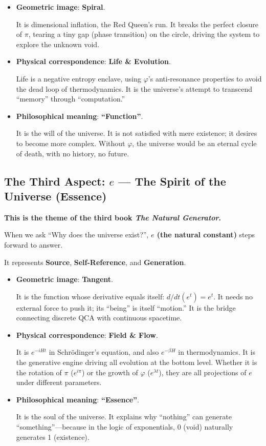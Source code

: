 \documentclass[11pt,a4paper,twoside]{book}
\begin{document}
\begin{itemize}
\item \textbf{Geometric image}: \textbf{Spiral}.

    It is dimensional inflation, the Red Queen's run. It breaks the perfect closure of $\pi$, tearing a tiny gap (phase transition) on the circle, driving the system to explore the unknown void.

\item \textbf{Physical correspondence}: \textbf{Life \& Evolution}.

    Life is a negative entropy enclave, using $\varphi$'s anti-resonance properties to avoid the dead loop of thermodynamics. It is the universe's attempt to transcend ``memory'' through ``computation.''

\item \textbf{Philosophical meaning}: \textbf{``Function''}.

    It is the will of the universe. It is not satisfied with mere existence; it desires to become more complex. Without $\varphi$, the universe would be an eternal cycle of death, with no history, no future.
\end{itemize}

\subsection{The Third Aspect: $e$ --- The Spirit of the Universe (Essence)}

\textbf{This is the theme of the third book \textit{The Natural Generator}.}

When we ask ``Why does the universe exist?'', \textbf{$e$ (the natural constant)} steps forward to answer.

It represents \textbf{Source}, \textbf{Self-Reference}, and \textbf{Generation}.

\begin{itemize}
\item \textbf{Geometric image}: \textbf{Tangent}.

    It is the function whose derivative equals itself: $d/dt(e^t) = e^t$. It needs no external force to push it; its ``being'' is itself ``motion.'' It is the bridge connecting discrete QCA with continuous spacetime.

\item \textbf{Physical correspondence}: \textbf{Field \& Flow}.

    It is $e^{-iHt}$ in Schrödinger's equation, and also $e^{-\beta H}$ in thermodynamics. It is the generative engine driving all evolution at the bottom level. Whether it is the rotation of $\pi$ ($e^{i\pi}$) or the growth of $\varphi$ ($e^{\lambda t}$), they are all projections of $e$ under different parameters.

\item \textbf{Philosophical meaning}: \textbf{``Essence''}.

    It is the soul of the universe. It explains why ``nothing'' can generate ``something''---because in the logic of exponentials, 0 (void) naturally generates 1 (existence).
\end{itemize}
\end{document}
